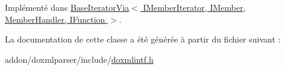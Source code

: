 Implémenté dans \hyperlink{class_base_iterator_via_aa9ceb9f5c11c005581fefa10a52f28f2}{Base\+Iterator\+Via$<$ I\+Member\+Iterator, I\+Member, Member\+Handler, I\+Function $>$}.



La documentation de cette classe a été générée à partir du fichier suivant \+:\begin{DoxyCompactItemize}
\item 
addon/doxmlparser/include/\hyperlink{include_2doxmlintf_8h}{doxmlintf.\+h}\end{DoxyCompactItemize}
